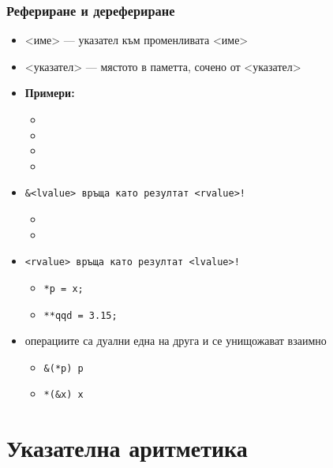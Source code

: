\documentclass[alsotrans]{beamerswitch}
\begin{document}
\begin{frame}
  \frametitle{Рефериране и дерефериране}

  \begin{itemize}[<+->]
  \item \tta{\&}<име> --- указател към променливата <име>
  \item \tta*<указател> --- мястото в паметта, сочено от <указател>
  \item \textbf{Примери:}
    \begin{itemize}
    \item {}
    \item {}
    \item {}
    \item {}
    \end{itemize}
  \item \tt{\&}<lvalue> връща като резултат <rvalue>!
    \begin{itemize}
    \item {}
    \item {}
    \end{itemize}
  \item \tt*<rvalue> връща като резултат <lvalue>!
    \begin{itemize}
    \item \tt{*p = x;}
    \item \tt{**qqd = 3.15;}
    \end{itemize}
  \item операциите са дуални една на друга и се унищожават взаимно
    \begin{itemize}
    \item \tt{\&(*p)} \eqv \tt{p}
    \item \tt{*(\&x)} \eqv \tt{x}
    \end{itemize}
  \end{itemize}
\end{frame}

\section{Указателна аритметика}
\end{document}
